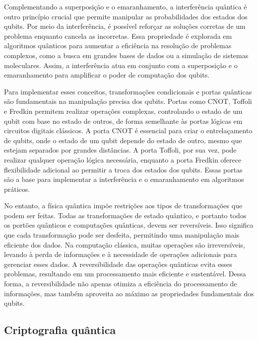 Complementando a superposição e o emaranhamento, a interferência quântica é outro princípio crucial que permite manipular as probabilidades dos estados dos qubits. Por meio da interferência, é possível reforçar as soluções corretas de um problema enquanto cancela as incorretas. Essa propriedade é explorada em algoritmos quânticos para aumentar a eficiência na resolução de problemas complexos, como a busca em grandes bases de dados ou a simulação de sistemas moleculares. Assim, a interferência atua em conjunto com a superposição e o emaranhamento para amplificar o poder de computação dos qubits.

Para implementar esses conceitos, transformações condicionais e portas quânticas são fundamentais na manipulação precisa dos qubits. Portas como CNOT, Toffoli e Fredkin permitem realizar operações complexas, controlando o estado de um qubit com base no estado de outros, de forma semelhante às portas lógicas em circuitos digitais clássicos. A porta CNOT é essencial para criar o entrelaçamento de qubits, onde o estado de um qubit depende do estado de outro, mesmo que estejam separados por grandes distâncias. A porta Toffoli, por sua vez, pode realizar qualquer operação lógica necessária, enquanto a porta Fredkin oferece flexibilidade adicional ao permitir a troca dos estados dos qubits. Essas portas são a base para implementar a interferência e o emaranhamento em algoritmos práticos.

No entanto, a física quântica impõe restrições aos tipos de transformações que podem ser feitas. Todas as transformações de estado quântico, e portanto todos os portões quânticos e computações quânticas, devem ser reversíveis. Isso significa que cada transformação pode ser desfeita, permitindo uma manipulação mais eficiente dos dados. Na computação clássica, muitas operações são irreversíveis, levando à perda de informações e à necessidade de operações adicionais para gerenciar esses dados. A reversibilidade das operações quânticas evita esses problemas, resultando em um processamento mais eficiente e sustentável. Dessa forma, a reversibilidade não apenas otimiza a eficiência do processamento de informações, mas também aproveita ao máximo as propriedades fundamentais dos qubits.


\subsection{Criptografia quântica}

